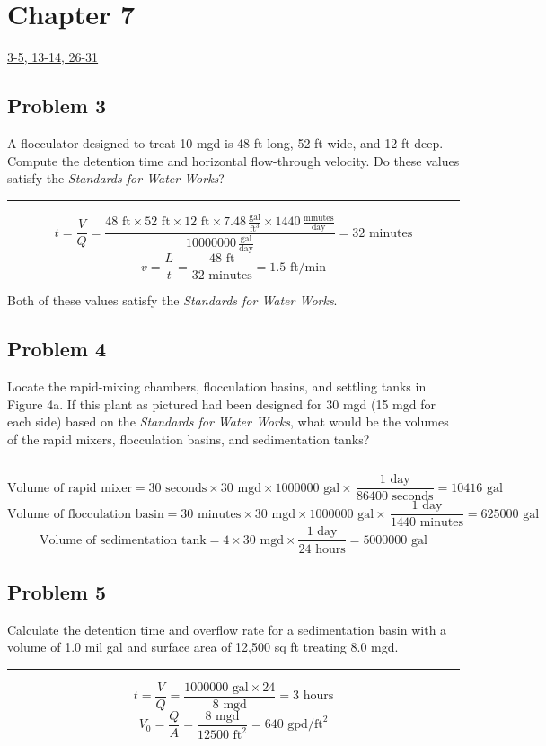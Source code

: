 \section*{Chapter 7}
\underline{3-5, 13-14, 26-31}
\subsection*{Problem 3}
A flocculator designed to treat 10 mgd is 48 ft long, 52 ft wide, and 12 ft deep. Compute the detention time and horizontal flow-through velocity. Do these values satisfy the \textit{Standards for Water Works}?
\\\rule{5cm}{1pt}
\[t=\frac{V}{Q}=\frac{48\text{ ft}\times52\text{ ft}\times12\text{ ft}\times7.48\,\frac{\text{gal}}{\text{ft}^3}\times1440\,\frac{\text{minutes}}{\text{day}}}{10000000\,\frac{\text{gal}}{\text{day}}}=\boxed{32\text{ minutes}}\]
\[v=\frac{L}{t}=\frac{48\text{ ft}}{32\text{ minutes}}=\boxed{1.5\text{ ft/min}}\]
\begin{center}
Both of these values satisfy the \textit{Standards for Water Works}.
\end{center}
\subsection*{Problem 4}
Locate the rapid-mixing chambers, flocculation basins, and settling tanks in Figure 4a. If this plant as pictured had been designed for 30 mgd (15 mgd for each side) based on the \textit{Standards for Water Works}, what would be the volumes of the rapid mixers, flocculation basins, and sedimentation tanks?
\\\rule{5cm}{1pt}
\[\text{Volume of rapid mixer}=30\text{ seconds}\times30\text{ mgd}\times1000000 \text{ gal}\times\,\frac{1 \text{ day}}{86400 \text{ seconds}}=\boxed{10416 \text{ gal}}\]
\[\text{Volume of flocculation basin}=30\text{ minutes}\times30\text{ mgd}\times1000000 \text{ gal}\times\,\frac{1 \text{ day}}{1440 \text{ minutes}}=\boxed{625000 \text{ gal}}\]
\[\text{Volume of sedimentation tank}=4\times30\text{ mgd}\times\frac{1 \text{ day}}{24\text{ hours}}=\boxed{5000000 \text{ gal}}\]
\subsection*{Problem 5}
Calculate the detention time and overflow rate for a sedimentation basin with a volume of 1.0 mil gal and surface area of 12,500 sq ft treating 8.0 mgd. 
\\\rule{5cm}{1pt}
\[t=\frac{V}{Q}=\frac{1000000\text{ gal}\times24}{8\text{ mgd}}=\boxed{3\text{ hours}}\]
\[V_0=\frac{Q}{A}=\frac{8\text{ mgd}}{12500\text{ ft}^2}=\boxed{640\text{ gpd/ft}^2}\]
\newpage
